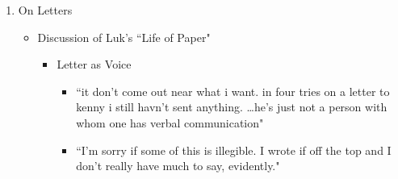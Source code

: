 \documentclass[14pt, letterpaper]{report}
\begin{document}
	\begin{enumerate}

%
%			
	
		\item On Letters
		\begin{itemize}
		
			\item Discussion of Luk's ``Life of Paper"
			\begin{itemize}
				
				\item Letter as Voice
				\begin{itemize}
					
%

					\item ``it don't come out near what i want.
						in four tries on a letter to kenny i still havn't sent 
						anything. \ldots he's just not a person with whom one 
						has verbal communication"\autocite[87]{letters-from-attica}

					\item ``I'm sorry if some of this is illegible. I wrote if off the top 
						and I don't really have much to say, evidently."\autocite[144]{letters-from-attica}			
					
				\end{itemize}


\end{itemize}
\end{itemize}
\end{enumerate}
\end{document}
